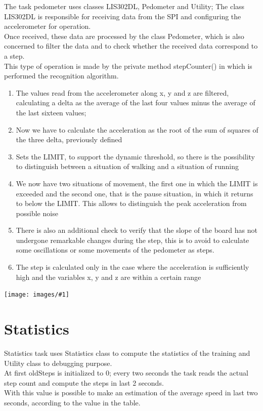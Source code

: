 \documentclass[a4paper,12pt,oneside]{report}
\newcommand{\imageinsert}[3]{
\begin{center}
\texttt{[image: images/\#1]}
\captionof{figure}{#2}
\end{center}}
\begin{document}
The task pedometer uses classes LIS302DL, Pedometer and Utility;
The class LIS302DL is responsible for receiving data from the SPI and configuring the accelerometer for operation. \\
Once received, these data are processed by the class Pedometer,
which is also concerned to filter the data and to check whether
the received data correspond to a step. \\
This type of operation is made by the private method stepCounter()
in which is performed the recognition algorithm.
\begin {enumerate}
\item The values read from the accelerometer along x, y and z are filtered,
calculating a delta as the average of the last four values minus
the average of the last sixteen values;
\item Now we have to calculate the acceleration as the root of the sum of squares of the
three delta, previously defined
\item Sets the LIMIT, to support the dynamic threshold, so
there is the possibility to distinguish between a situation of walking
and a situation of running
\item We now have two situations of movement, the first one in which the LIMIT
is exceeded and the second one, that is the pause situation, in which it returns to below the LIMIT.
This allows to distinguish the peak acceleration from possible
noise
\item There is also an additional check to verify that the slope of
the board has not undergone remarkable changes during the step, this is 
to avoid to calculate some oscillations or some movements of the pedometer 
as steps.
\item The step is calculated only in the case where the acceleration is sufficiently high
and the variables x, y and z are within a certain range
\end{enumerate}
\imageinsert{pedometer.jpg}{Pedometer Alghoritm}{0.5}

\section{Statistics}

Statistics task uses Statistics class to compute the statistics 
of the training and Utility class to debugging purpose.\\
At first oldSteps is initialized to 0; every two seconds the task reads the actual step count and compute the steps in last 2 seconds.\\
With this value is possible to make an estimation of the average speed in last two seconds, according to the value in the table.
\end{document}
